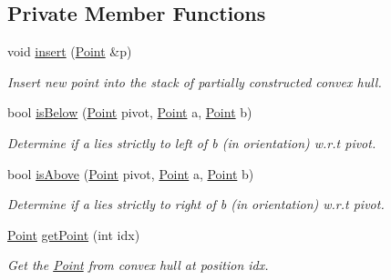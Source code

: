 \subsection*{Private Member Functions}
\begin{DoxyCompactItemize}
\item 
void \mbox{\hyperlink{classGrahamScan_a4996cb0d2deb3cd6f9cb3df99b91e7e8}{insert}} (\mbox{\hyperlink{classPoint}{Point}} \&p)
\begin{DoxyCompactList}\small\item\em Insert new point into the stack of partially constructed convex hull. \end{DoxyCompactList}\item 
bool \mbox{\hyperlink{classGrahamScan_aff60053b35be2c735b37dd88e079d460}{is\+Below}} (\mbox{\hyperlink{classPoint}{Point}} pivot, \mbox{\hyperlink{classPoint}{Point}} a, \mbox{\hyperlink{classPoint}{Point}} b)
\begin{DoxyCompactList}\small\item\em Determine if \textquotesingle{}a\textquotesingle{} lies strictly to left of \textquotesingle{}b\textquotesingle{} (in orientation) w.\+r.\+t pivot. \end{DoxyCompactList}\item 
bool \mbox{\hyperlink{classGrahamScan_ab860e33708a7cf494b0708c49a303c0c}{is\+Above}} (\mbox{\hyperlink{classPoint}{Point}} pivot, \mbox{\hyperlink{classPoint}{Point}} a, \mbox{\hyperlink{classPoint}{Point}} b)
\begin{DoxyCompactList}\small\item\em Determine if a lies strictly to right of b (in orientation) w.\+r.\+t pivot. \end{DoxyCompactList}\item 
\mbox{\hyperlink{classPoint}{Point}} \mbox{\hyperlink{classGrahamScan_a79b1642bc347f2f6e517b2f3415e871d}{get\+Point}} (int idx)
\begin{DoxyCompactList}\small\item\em Get the \mbox{\hyperlink{classPoint}{Point}} from convex hull at position \textquotesingle{}idx\textquotesingle{}. \end{DoxyCompactList}\end{DoxyCompactItemize}
